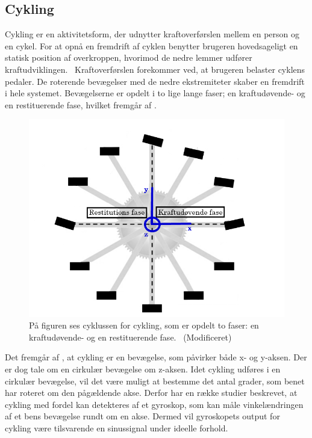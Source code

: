 \subsection{Cykling}
Cykling er en aktivitetsform, der udnytter kraftoverførslen mellem en person og en cykel. For at opnå en fremdrift af cyklen benytter brugeren hovedsageligt en statisk position af overkroppen, hvorimod de nedre lemmer udfører kraftudviklingen.~\citep{Springer2014} Kraftoverførslen forekommer ved, at brugeren belaster cyklens pedaler. De roterende bevægelser med de nedre ekstremiteter skaber en fremdrift i hele systemet. Bevægelserne er opdelt i to lige lange faser; en kraftudøvende- og en restituerende fase, hvilket fremgår af .
\begin{figure}[H]
	\centering
	\includegraphics[scale=0.55]{figures/bProblemloesning/cykel_cyklus.png}
	\caption{På figuren ses cyklussen for cykling, som er opdelt to faser: en kraftudøvende- og en restituerende fase.~\citep{Springer2014} (Modificeret)}
	\label{fig:cykel_cyklus}
\end{figure}\vspace{-0.25cm}
Det fremgår af , at cykling er en bevægelse, som påvirker både x- og y-aksen. Der er dog tale om en cirkulær bevægelse om z-aksen. Idet cykling udføres i en cirkulær bevægelse, vil det være muligt at bestemme det antal grader, som benet har roteret om den pågældende akse. Derfor har en række studier beskrevet, at cykling med fordel kan detekteres af et gyroskop, som kan måle vinkelændringen af et bens bevægelse rundt om en akse. Dermed vil gyroskopets output for cykling være tilsvarende en sinussignal under ideelle forhold.~\citep{Cockcroft2011,Marin-PerianuMarin-Perianu2013} 

